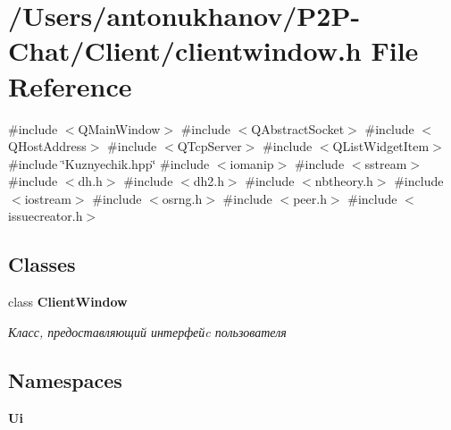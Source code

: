 \section{/\+Users/antonukhanov/\+P2\+P-\/\+Chat/\+Client/clientwindow.h File Reference}
\label{clientwindow_8h}
{\ttfamily \#include $<$Q\+Main\+Window$>$}\newline
{\ttfamily \#include $<$Q\+Abstract\+Socket$>$}\newline
{\ttfamily \#include $<$Q\+Host\+Address$>$}\newline
{\ttfamily \#include $<$Q\+Tcp\+Server$>$}\newline
{\ttfamily \#include $<$Q\+List\+Widget\+Item$>$}\newline
{\ttfamily \#include \char`\"{}Kuznyechik.\+hpp\char`\"{}}\newline
{\ttfamily \#include $<$iomanip$>$}\newline
{\ttfamily \#include $<$sstream$>$}\newline
{\ttfamily \#include $<$dh.\+h$>$}\newline
{\ttfamily \#include $<$dh2.\+h$>$}\newline
{\ttfamily \#include $<$nbtheory.\+h$>$}\newline
{\ttfamily \#include $<$iostream$>$}\newline
{\ttfamily \#include $<$osrng.\+h$>$}\newline
{\ttfamily \#include $<$peer.\+h$>$}\newline
{\ttfamily \#include $<$issuecreator.\+h$>$}\newline
\subsection*{Classes}
\begin{DoxyCompactItemize}
\item 
class \textbf{ Client\+Window}
\begin{DoxyCompactList}\small\item\em Класс, предоставляющий интерфейc пользователя \end{DoxyCompactList}\end{DoxyCompactItemize}
\subsection*{Namespaces}
\begin{DoxyCompactItemize}
\item 
 \textbf{ Ui}
\end{DoxyCompactItemize}
